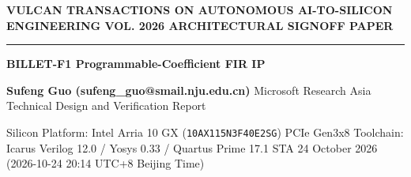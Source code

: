 \documentclass[11pt,a4paper]{article}
\begin{document}
{\scriptsize\sffamily\textcolor{vulcan}{\textbf{VULCAN TRANSACTIONS ON AUTONOMOUS AI-TO-SILICON ENGINEERING \hfill VOL. 2026 \textperiodcentered{} ARCHITECTURAL SIGNOFF PAPER}}\par}

\vspace{1pt}\textcolor{vulcan}{\rule{\textwidth}{1.2pt}}\vspace{4pt}

\begin{center}

{\sffamily\LARGE\bfseries BILLET-F1 Programmable-Coefficient FIR IP\par}\vspace{3pt}

{\small\sffamily\textbf{Sufeng Guo (\allowbreak{}sufeng\_\allowbreak{}guo@smail.nju.edu.cn)\allowbreak{}} \textperiodcentered{} Microsoft Research Asia \textperiodcentered{} Technical Design and Verification Report\par}\vspace{1pt}

{\scriptsize\sffamily\textcolor{black!75}{Silicon Platform: Intel Arria 10 GX (\texttt{10AX115N3F40E2SG}) PCIe Gen3x8 \textperiodcentered{} Toolchain: Icarus Verilog 12.0 / Yosys 0.33 / Quartus Prime 17.1 STA \textperiodcentered{} 24 October 2026 (\allowbreak{}2026-10-24 20:14 UTC+\allowbreak{}8 Beijing Time)\allowbreak{}}\par}

\end{center}\vspace{2pt}
\end{document}
